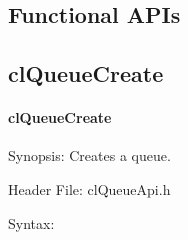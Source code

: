 \begin{flushleft}
\newpage

\section{Functional APIs}
\subsection{clQueueCreate}
\hypertarget{pageq101}{}\paragraph{cl\-Queue\-Create}\label{pageq101}
\begin{Desc}
\item[Synopsis:]Creates a queue.\end{Desc}
\begin{Desc}
\item[Header File:]clQueueApi.h\end{Desc}
\begin{Desc}
\item[Syntax:]


\end{Desc}
\end{flushleft}
